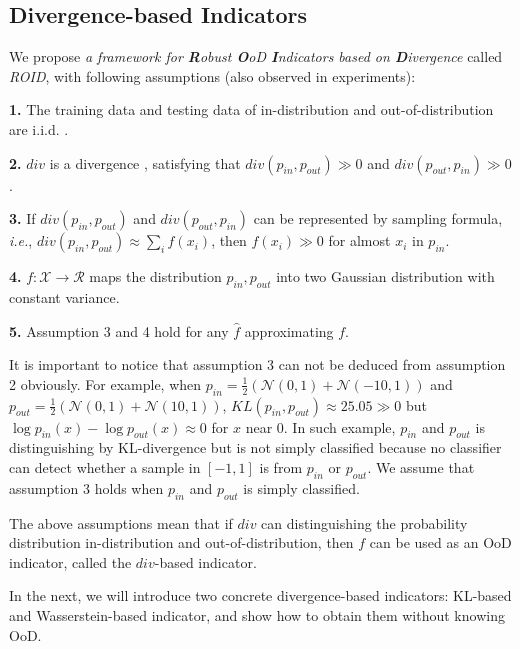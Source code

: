 \documentclass[letterpaper]{article} %
\newcommand{\IE}{\textit{i.e.}, }
\newcommand{\EG}{\textit{e.g.}, }
\newcommand{\ROID}{\textit{ROID}}
\newcommand{\pin}{p_{in}}
\newcommand{\pout}{p_{out}}
\begin{document}
\subsection{Divergence-based Indicators}
We propose \textit{a framework for \textbf{R}obust \textbf{O}oD \textbf{I}ndicators based on \textbf{D}ivergence} called \ROID{}, with following assumptions (also observed in experiments):

\noindent \textbf{1.} The training data and testing data of in-distribution and out-of-distribution are i.i.d. .

\noindent \textbf{2.}  $div$ is a divergence , satisfying that $div(\pin, \pout) \gg 0$ and $div(\pout, \pin) \gg 0$. 

\noindent \textbf{3.}  If $div(\pin, \pout)$ and $div(\pout, \pin)$ can be represented by sampling formula, \IE $div(\pin, \pout) \approx \sum_{i} f(x_i)$, then $f(x_i) \gg 0$ for almost $x_i$ in $\pin$. 

\noindent \textbf{4.} $f: \mathcal{X} \rightarrow \mathcal{R}$ maps the distribution $\pin, \pout$ into two Gaussian distribution with constant variance. 

\noindent \textbf{5.} Assumption 3 and 4 hold for any $\hat{f}$ approximating $f$. 


It is important to notice that assumption 3 can not be deduced from assumption 2 obviously. For example, when $\pin = \frac{1}{2}(\mathcal{N}(0, 1) + \mathcal{N}(-10, 1))$ and $\pout = \frac{1}{2}(\mathcal{N}(0, 1) + \mathcal{N}(10, 1))$, $KL(\pin, \pout) \approx 25.05 \gg 0$ but $\log \pin(x) - \log \pout(x) \approx 0$ for $x$ near 0.  In such example, $\pin$ and $\pout$ is distinguishing by KL-divergence but is not simply classified because no classifier can detect whether a sample in $[-1, 1]$ is from $\pin$ or $\pout$. We assume that assumption 3 holds when $\pin$ and $\pout$ is simply classified. 

The above assumptions mean that if $div$ can distinguishing the probability distribution                                                                                                        in-distribution and out-of-distribution, then $f$ can be used as an OoD indicator, called the $div$-based indicator. 

In the next, we will introduce two concrete divergence-based indicators: KL-based and Wasserstein-based indicator, and show how to obtain them without knowing OoD. 
\end{document}
